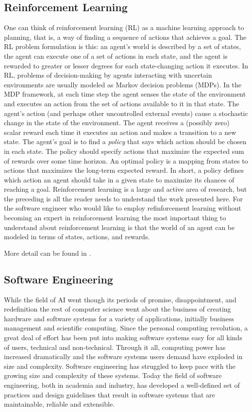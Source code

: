 \subsection{Reinforcement Learning}

One can think of reinforcement learning (RL) as a machine learning approach to planning, that is, a way of finding a sequence of actions that achieves a goal.  The RL problem formulation is this: an agent's world is described by a set of states, the agent can execute one of a set of actions in each state, and the agent is rewarded to greater or lesser degrees for each state-changing action it executes. In RL, problems of decision-making by agents interacting with uncertain environments are usually modeled as Markov decision problems (MDPs). In the MDP framework, at each time step the agent senses the state of the environment and executes an action from the set of actions available to it in that state. The agent's action (and perhaps other uncontrolled external events) cause a stochastic change in the state of the environment. The agent receives a (possibly zero) scalar reward each time it executes an action and makes a transition to a new state. The agent's goal is to find a {\it policy} that says which action should be chosen in each state.  The policy should specify actions that maximize the expected sum of rewards over some time horizon. An optimal policy is a mapping from states to actions that maximizes the long-term expected reward.  In short, a policy defines which action an agent should take in a given state to maximize its chances of reaching a goal.  Reinforcement learning is a large and active area of research, but the preceding is all the reader needs to understand the work presented here. For the software engineer who would like to employ refinforcement learning without becoming an expert in reinforcement learning the most important thing to understand about reinforcement learning is that the world of an agent can be modeled in terms of states, actions, and rewards.

More detail can be found in \cite{sutton1998reinforcement,kaelbling1996reinforcement}.

\subsection{Software Engineering}

While the field of AI went though its periods of promise, disappointment, and redefinition the rest of computer science went about the business of creating hardware and software systems for a variety of applications, initially business management and scientific computing.  Since the personal computing revolution, a great deal of effort has been put into making software systems easy for all kinds of users, technical and non-technical.  Through it all, computing power has increased dramatically and the software systems users demand have exploded in size and complexity.  Software engineering has struggled to keep pace with the growing size and complexity of these systems. Today the field of software engineering, both in academia and industry, has developed a well-defined set of practices and design guidelines that result in software systems that are maintainable, reliable and extensible.


